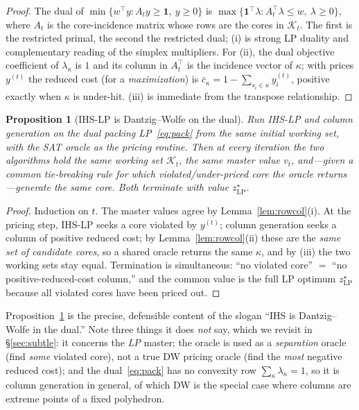 \documentclass[11pt,a4paper]{article}
\newtheorem{proposition}{Proposition}
\begin{document}
\begin{proof}
The dual of $\min\{w^\top y : A_t y \ge \mathbf 1,\ y \ge 0\}$ is $\max\{\mathbf
1^\top\lambda : A_t^\top \lambda \le w,\ \lambda \ge 0\}$, where $A_t$ is the
core-incidence matrix whose rows are the cores in $\mathcal{K}_t$. The first is
the restricted primal, the second the restricted dual; (i) is strong LP duality
and complementary reading of the simplex multipliers. For (ii), the dual
objective coefficient of $\lambda_\kappa$ is $1$ and its column in $A_t^\top$ is
the incidence vector of $\kappa$; with prices $y^{(t)}$ the reduced cost (for a
\emph{maximization}) is $\bar c_\kappa = 1 - \sum_{s_i \in \kappa} y^{(t)}_i$,
positive exactly when $\kappa$ is under-hit. (iii) is immediate from the
transpose relationship.
\end{proof}

\begin{proposition}[IHS-LP is Dantzig--Wolfe on the dual]
\label{prop:equiv}
Run IHS-LP and column generation on the dual packing
LP~\eqref{eq:pack} from the same initial working set, with the SAT oracle as the
pricing routine. Then at every iteration the two algorithms hold the same
working set $\mathcal{K}_t$, the same master value $v_t$, and---given a common
tie-breaking rule for which violated/under-priced core the oracle
returns---generate the \emph{same} core. Both terminate with value
$z^\star_{\mathrm{LP}}$.
\end{proposition}

\begin{proof}
Induction on $t$. The master values agree by Lemma~\ref{lem:rowcol}(i). At the
pricing step, IHS-LP seeks a core violated by $y^{(t)}$; column generation seeks
a column of positive reduced cost; by Lemma~\ref{lem:rowcol}(ii) these are the
\emph{same set of candidate cores}, so a shared oracle returns the same
$\kappa$, and by (iii) the two working sets stay equal. Termination is
simultaneous: ``no violated core'' $=$ ``no positive-reduced-cost column,'' and
the common value is the full LP optimum $z^\star_{\mathrm{LP}}$ because all
violated cores have been priced out.
\end{proof}

Proposition~\ref{prop:equiv} is the precise, defensible content of the slogan
``IHS is Dantzig--Wolfe in the dual.'' Note three things it does \emph{not} say,
which we revisit in \S\ref{sec:subtle}: it concerns the \emph{LP} master; the
oracle is used as a \emph{separation} oracle (find \emph{some} violated core),
not a true DW pricing oracle (find the \emph{most} negative reduced cost); and
the dual~\eqref{eq:pack} has no convexity row $\sum_\kappa \lambda_\kappa = 1$,
so it is column generation in general, of which DW is the special case where
columns are extreme points of a fixed polyhedron.
\end{document}
